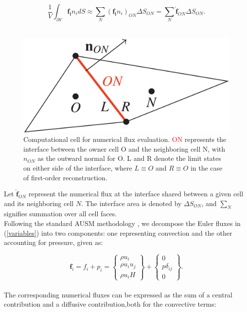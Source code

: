 \documentclass[a5paper]{sapthesis}
\begin{document}
	\begin{equation}
		\frac{1}{V} \int_{\partial V} \mathbf{f_i} n_i dS \approx \sum_N (\mathbf{f_i} n_i)_{ON} \Delta S_{ON} = \sum_N \mathbf{\hat{f}}_{ON} \Delta S_{ON}.
	\end{equation}
	\\
	\begin{figure}[h]
		\centering
		\includegraphics[width=0.4 \linewidth]{Figures/CELL.png}
		\caption[2D computational cell for numerical flux evaluation.]{Computational cell for numerical flux evaluation. \textcolor{red}{ON} represents the interface between the owner cell O and the neighboring cell N, with $n_{ON}$ as the outward normal for O. L and R denote the limit states on either side of the interface, where $L\equiv O$ and $R \equiv O$ in the case of first-order reconstruction.}
		\label{figure:cells}
	\end{figure} 
	
	\noindent Let $\mathbf{\hat{f}}_{ON}$ represent the numerical flux at the interface shared between a given cell and its neighboring cell $N$. The interface area is denoted by $\Delta S_{ON}$, and $\sum_N$ signifies summation over all cell faces.
	\\
	Following the standard AUSM methodology \cite{LIOU_AUSM}, we decompose the Euler fluxes in (\ref{variables})  into two components: one representing convection and the other accounting for pressure, given as:
	
	\begin{equation}
		\mathbf{f}_i = f_i + p_i =
		\begin{Bmatrix}
			\rho u_i \\
			\rho u_i u_j \\
			\rho u_i H
		\end{Bmatrix}
		+
		\begin{Bmatrix}
			0 \\
			p \delta_{ij} \\
			0
		\end{Bmatrix}.
	\end{equation}
	\\
	The corresponding numerical fluxes can be expressed as the sum of a central contribution and a diffusive contribution,both for the convective terms:
	
\end{document}
